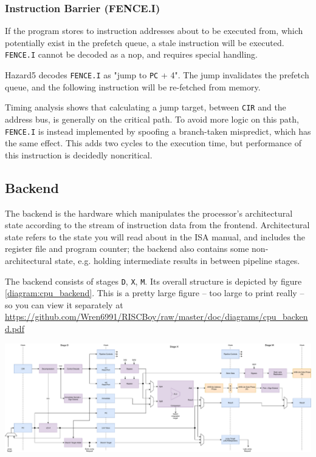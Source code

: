 \subsubsection{Instruction Barrier (FENCE.I)}

If the program stores to instruction addresses about to be executed from, which potentially exist in the prefetch queue, a stale instruction will be executed. {\tt FENCE.I} cannot be decoded as a nop, and requires special handling.

Hazard5 decodes {\tt FENCE.I} as "jump to {\tt PC} + 4". The jump invalidates the prefetch queue, and the following instruction will be re-fetched from memory.

Timing analysis shows that calculating a jump target, between {\tt CIR} and the address bus, is generally on the critical path. To avoid more logic on this path, {\tt FENCE.I} is instead implemented by spoofing a branch-taken mispredict, which has the same effect. This adds two cycles to the execution time, but performance of this instruction is decidedly noncritical.

\subsection{Backend}

The backend is the hardware which manipulates the processor's architectural state according to the stream of instruction data from the frontend. Architectural state refers to the state you will read about in the ISA manual, and includes the register file and program counter; the backend also contains some non-architectural state, e.g. holding intermediate results in between pipeline stages.

The backend consists of stages {\tt D}, {\tt X}, {\tt M}. Its overall structure is depicted by figure \ref{diagram:cpu_backend}. This is a pretty large figure -- too large to print really -- so you can view it separately at \url{https://github.com/Wren6991/RISCBoy/raw/master/doc/diagrams/cpu_backend.pdf}

\newpage

\begin{center}
	\begin{sideways}
		\begin{minipage}{\textheight}
			\includegraphics[width=\textheight]{diagrams/cpu_backend.pdf}
			\label{diagram:cpu_backend}
		\end{minipage}
	\end{sideways}
\end{center}

